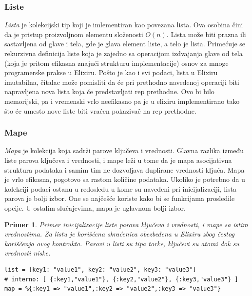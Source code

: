\documentclass[a4paper]{article}
\newtheorem{primer}{Primer}[section]
\begin{document}
\subsubsection{Liste}
\label{sec:ime}
\textit{Lista} je kolekcijski tip koji je imlementiran kao povezana lista. Ova osobina čini da je pristup proizvoljnom elementu složenosti \( O(n) \). Lista može biti prazna ili sastavljena od glave i tela, gde je glava element liste, a telo je lista. Primećuje se rekurzivna definicija liste koja je zajedno sa operacijom izdvajanja glave od tela (koja je pritom efikasna znajući strukturu implementacije) osnov za mnoge programerske prakse u Elixiru. Pošto je kao i svi podaci, lista u Elixiru imutabilna, čitalac može pomisliti da će pri prethodno navedenoj operaciji biti napravljena nova lista koja će predstavljati rep prethodne. Ovo bi bilo memorijski, pa i vremenski vrlo neefikasno pa je u elixiru implementirano tako što će umesto nove liste biti vraćen pokazivač na rep prethodne.%

\subsubsection{Mape}
\label{sec:ime}
\textit{Mapa} je kolekcija koja sadrži parove ključeva i vrednosti. Glavna razlika između liste parova ključeva i vrednosti, i mape leži u tome da je mapa asocijativna struktura podataka i samim tim ne dozvoljava duplirane vrednosti ključa. Mapa je vrlo efikasna, pogotovo sa rastom količine podataka. Ukoliko je potrebno da u kolekciji podaci ostanu u redosledu u kome su navedeni pri inicijalizaciji, lista parova je bolji izbor. One se najčešće koriste kako bi se funkcijama prosledile opcije. U ostalim slučajevima, mapa je uglavnom bolji izbor.%
\begin{primer}
Primer inicijalizacije liste parova ključeva i vrednosti, i mape sa istim vrednostima. Za listu je korišćena skraćenica obezbeđena u Elixiru zbog čestog koriščenja ovog kontrukta. Parovi u listi su tipa torke, ključevi su atomi dok su vrednosti niske.
\end{primer}
\begin{lstlisting}[caption={Primer liste parova ključeva i vrednosti, i mape},frame=none, label=simple]
list = [key1: "value1", key2: "value2", key3: "value3"]
# interno: [ {:key1,"value1"}, {:key2,"value2"}, {:key3,"value3"} ]
map = %{:key1 => "value1",:key2 => "value2",:key3 => "value3"}
\end{lstlisting}
\end{document}
